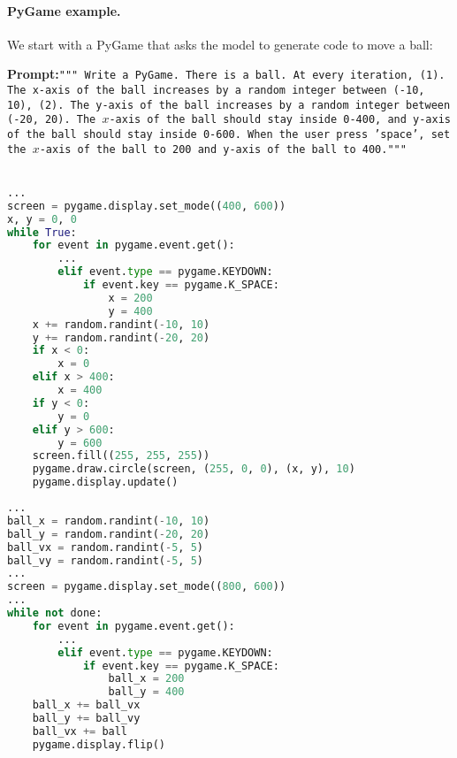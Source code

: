 \paragraph{PyGame example.} We start with a PyGame that asks the model to generate code to move a ball:

\begin{AIbox}{}
\textbf{Prompt:}\newline \tt{\footnotesize """ Write a PyGame. There is a ball. At every iteration, (1). The x-axis of the ball increases by a random integer between (-10, 10), (2). The y-axis of the ball increases by a random integer between (-20, 20). The $x$-axis of the ball should stay inside 0-400, and y-axis of the ball should stay inside 0-600. When the user press 'space', set the $x$-axis of the ball to 200 and y-axis of the ball to 400.\newline """}
\\
\\
\begin{minipage}[t]{0.33\linewidth}
\textbf{\phione}
\begin{lstlisting}[language=Python, style=mystyle]
...
screen = pygame.display.set_mode((400, 600))
x, y = 0, 0
while True:
    for event in pygame.event.get():
        ...
        elif event.type == pygame.KEYDOWN:
            if event.key == pygame.K_SPACE:
                x = 200
                y = 400
    x += random.randint(-10, 10)
    y += random.randint(-20, 20)
    if x < 0:
        x = 0
    elif x > 400:
        x = 400
    if y < 0:
        y = 0
    elif y > 600:
        y = 600
    screen.fill((255, 255, 255))
    pygame.draw.circle(screen, (255, 0, 0), (x, y), 10)
    pygame.display.update()
\end{lstlisting}
\end{minipage}
\begin{minipage}[t]{0.33\linewidth}
\textbf{\phionebase}
\begin{lstlisting}[language=Python, style=mystyle]
...
ball_x = random.randint(-10, 10)
ball_y = random.randint(-20, 20)
ball_vx = random.randint(-5, 5)
ball_vy = random.randint(-5, 5)
...
screen = pygame.display.set_mode((800, 600))
...
while not done:
    for event in pygame.event.get():
        ...
        elif event.type == pygame.KEYDOWN:
            if event.key == pygame.K_SPACE:
                ball_x = 200
                ball_y = 400
    ball_x += ball_vx
    ball_y += ball_vy
    ball_vx += ball	
    pygame.display.flip()
\end{lstlisting}
\end{minipage}

\end{AIbox}
